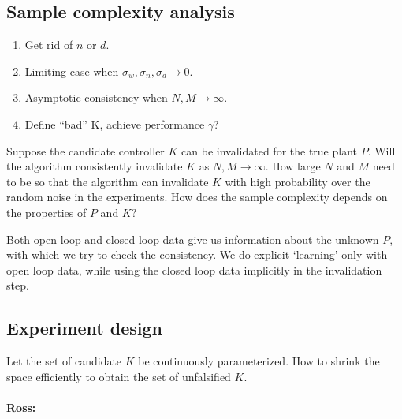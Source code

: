 \documentclass[11pt, onecolumn]{article}
\begin{document}
\subsection{Sample complexity analysis}

\begin{enumerate}
\item Get rid of $n$ or $d$.
\item Limiting case when $\sigma_w, \sigma_n,\sigma_d\to 0$.
\item Asymptotic consistency when $N,M\to \infty$.
\item Define ``bad'' K, achieve performance $\gamma$?
\end{enumerate}




Suppose the candidate controller $K$ can be invalidated for the true plant $P$.   Will
the algorithm consistently invalidate $K$ as $N,M\to\infty$.  How large $N$ and $M$ need to be so that the
algorithm can invalidate $K$ with high probability over the random noise in the experiments. How
does the sample complexity depends on the properties of $P$ and $K$?

Both open loop and closed loop data give us information about the unknown $P$, with which we try to
check the consistency.  We do explicit `learning' only with open loop data, while using the closed
loop data implicitly in the invalidation step.


\subsection{Experiment design}

Let the set of candidate $K$ be continuously parameterized. How to shrink the space efficiently to
obtain the set of unfalsified $K$.





\paragraph{Ross:}
\end{document}
